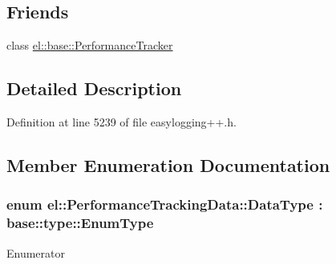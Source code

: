 \subsection*{Friends}
\begin{DoxyCompactItemize}
\item 
class \hyperlink{classel_1_1_performance_tracking_data_a6a4d7851e1984800be3c230f06a79528}{el\+::base\+::\+Performance\+Tracker}
\end{DoxyCompactItemize}


\subsection{Detailed Description}


Definition at line 5239 of file easylogging++.\+h.



\subsection{Member Enumeration Documentation}
\hypertarget{classel_1_1_performance_tracking_data_a1b45d5b1d5e76d0687aaffcf08302f17}{}
\subsubsection[{Data\+Type}]{\setlength{\rightskip}{0pt plus 5cm}enum {\bf el\+::\+Performance\+Tracking\+Data\+::\+Data\+Type} \+: {\bf base\+::type\+::\+Enum\+Type}\hspace{0.3cm}{\ttfamily [strong]}}\label{classel_1_1_performance_tracking_data_a1b45d5b1d5e76d0687aaffcf08302f17}
\begin{Desc}
\item[Enumerator]\par
\begin{description}
\item[{\em 
\hypertarget{classel_1_1_performance_tracking_data_a1b45d5b1d5e76d0687aaffcf08302f17aef41311079c448d0beb06ec07db0bf8c}{}Checkpoint\label{classel_1_1_performance_tracking_data_a1b45d5b1d5e76d0687aaffcf08302f17aef41311079c448d0beb06ec07db0bf8c}
}]\item[{\em 
\hypertarget{classel_1_1_performance_tracking_data_a1b45d5b1d5e76d0687aaffcf08302f17aae94f80b3ce82062a5dd7815daa04f9d}{}Complete\label{classel_1_1_performance_tracking_data_a1b45d5b1d5e76d0687aaffcf08302f17aae94f80b3ce82062a5dd7815daa04f9d}
}]\end{description}
\end{Desc}


